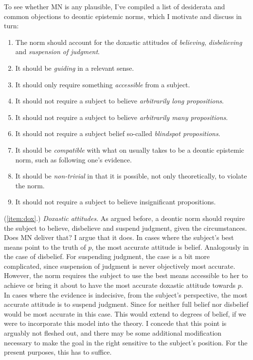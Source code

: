 \documentclass[12pt,numbers=noenddot]{scrartcl}
\begin{document}
To see whether MN is any plausible, I've compiled a list of desiderata and common objections to deontic epistemic norms, which I motivate and discuss in turn:
\begin{enumerate}
    \itemsep-0.2em
    \item \label{item:dox} The norm should account for the doxastic attitudes of \emph{believing}, \emph{disbelieving} and \emph{suspension of judgment}.
    \item \label{item:guiding} It should be \emph{guiding} in a relevant sense.
    \item \label{item:accessible}It should only require something \emph{accessible} from a subject.
    \item \label{item:arbitrarilylong}It should not require a subject to believe \emph{arbitrarily long propositions}.
    \item \label{item:arbitrarilymany}It should not require a subject to believe \emph{arbitrarily many propositions}.
    \item \label{item:blindspot}It should not require a subject belief so-called \emph{blindspot propositions}.
    \item \label{item:compatible}It should be \emph{compatible} with what on usually takes to be a deontic epistemic norm, such as following one's evidence.
    \item \label{item:nontrivial}It should be \emph{non-trivial} in that it is possible, not only theoretically, to violate the norm.
    \item \label{item:insignificant} It should not require a subject to believe insignificant propositions.
\end{enumerate}

(\ref{item:dox}.) \emph{Doxastic attitudes.} 
As argued before, a deontic norm should require the subject to believe, disbelieve and suspend judgment, given the circumstances. Does MN deliver that? I argue that it does. In cases where the subject's best means point to the truth of $p$, the most accurate attitude is belief. Analogously in the case of disbelief. For suspending judgment, the case is a bit more complicated, since suspension of judgment is never objectively most accurate. However, the norm requires the subject to use the best means accessible to her to achieve or bring it about to have the most accurate doxastic attitude towards $p$. In cases where the evidence is indecisive, from the subject's perspective, the most accurate attitude is to suspend judgment. Since for neither full belief nor disbelief would be most accurate in this case. This would extend to degrees of belief, if we were to incorporate this model into the theory. I concede that this point is arguably not fleshed out, and there may be some additional modification necessary to make the goal in the right sensitive to the subject's position. For the present purposes, this has to suffice.
\end{document}
